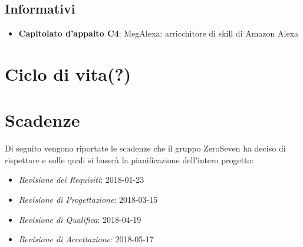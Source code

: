 \subsection{Informativi}
\begin{itemize}
	\item \textbf{Capitolato d'appalto C4}: MegAlexa: arricchitore di skill di Amazon Alexa
\end{itemize}
\section{Ciclo di vita(?)}
\section{Scadenze}
Di seguito vengono riportate le scadenze che il gruppo ZeroSeven ha deciso di rispettare e sulle quali si baserà la pianificazione dell'intero progetto:
\begin{itemize}
	\item \textit{Revisione dei Requisiti}: 2018-01-23
	\item \textit{Revisione di Progettazione}: 2018-03-15
	\item \textit{Revisione di Qualifica}: 2018-04-19
	\item \textit{Revisione di Accettazione}: 2018-05-17
\end{itemize}